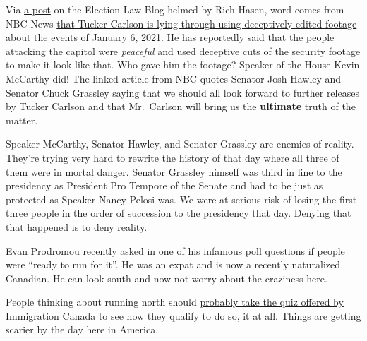 Via \href{https://electionlawblog.org/?p=134980}{a post} on the Election
Law Blog helmed by Rich Hasen, word comes from NBC News
\href{https://www.nbcnews.com/politics/justice-department/tucker-carlson-new-video-provided-speaker-mccarthy-falsely-depicts-jan-rcna73673?cid=sm_npd_nn_tw_ma}{that
Tucker Carlson is lying through using deceptively edited footage about
the events of January 6, 2021}. He has reportedly said that the people
attacking the capitol were \emph{peaceful} and used deceptive cuts of
the security footage to make it look like that. Who gave him the
footage? Speaker of the House Kevin McCarthy did! The linked article
from NBC quotes Senator Josh Hawley and Senator Chuck Grassley saying
that we should all look forward to further releases by Tucker Carlson
and that Mr.~Carlson will bring us the \textbf{ultimate} truth of the
matter.

Speaker McCarthy, Senator Hawley, and Senator Grassley are enemies of
reality. They're trying very hard to rewrite the history of that day
where all three of them were in mortal danger. Senator Grassley himself
was third in line to the presidency as President Pro Tempore of the
Senate and had to be just as protected as Speaker Nancy Pelosi was. We
were at serious risk of losing the first three people in the order of
succession to the presidency that day. Denying that that happened is to
deny reality.

Evan Prodromou recently asked in one of his infamous poll questions if
people were ``ready to run for it''. He was an expat and is now a
recently naturalized Canadian. He can look south and now not worry about
the craziness here.

People thinking about running north should
\href{https://www.canada.ca/en/immigration-refugees-citizenship/services/come-canada-tool.html}{probably
take the quiz offered by Immigration Canada} to see how they qualify to
do so, it at all. Things are getting scarier by the day here in America.
